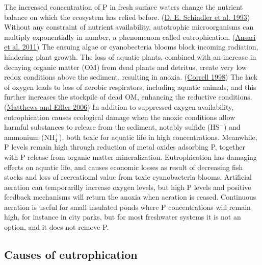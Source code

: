 \documentclass[a4paper,11pt]{article}
\begin{document}
The increased concentration of P in fresh surface waters change the nutrient balance on which the ecosystem has relied before. (\protect\hyperlink{ref-schindlerFoodWebStructure1993}{D. E. Schindler et al. 1993}) Without any constraint of nutrient availability, autotrophic microorganisms can multiply exponentially in number, a phenomenom called eutrophication. (\protect\hyperlink{ref-ansariEutrophicationCausesConsequences2011}{Ansari et al. 2011}) The ensuing algae or cyanobecteria blooms block incoming radiation, hindering plant growth. The loss of aquatic plants, combined with an increase in decaying organic matter (OM) from dead plants and detritus, create very low redox conditions above the sediment, resulting in anoxia. (\protect\hyperlink{ref-correllRolePhosphorusEutrophication1998}{Correll 1998}) The lack of oxygen leads to loss of aerobic respirators, including aquatic animals, and this further increases the stockpile of dead OM, enhancing the reductive conditions. (\protect\hyperlink{ref-matthewsLongTermChanges2006}{Matthews and Effler 2006}) In addition to suppressed oxygen availability, eutrophication causes ecological damage when the anoxic conditions allow harmful substances to release from the sediment, notably sulfide (HS\(^-\)) and ammonium (NH\(_4^+\)), both toxic for aquatic life in high concentrations. Meanwhile, P levels remain high through reduction of metal oxides adsorbing P, together with P release from organic matter mineralization. Eutrophication has damaging effects on aquatic life, and causes economic losses as result of decreasing fish stocks and loss of recreational value from toxic cyanobacteria blooms. Artificial aeration can temporarilly increase oxygen levels, but high P levels and positive feedback mechanisms will return the anoxia when aeration is ceased. Continuous aeration is useful for small insulated ponds where P concentrations will remain high, for instance in city parks, but for most freshwater systems it is not an option, and it does not remove P.

\hypertarget{causes-of-eutrophication}{%
\subsection{Causes of eutrophication}\label{causes-of-eutrophication}}
\end{document}
